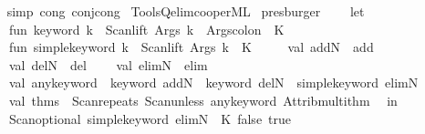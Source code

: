 \begin{isabellebody}
%
\isadelimproof
\ \ %
\endisadelimproof
%
\isatagproof
{}\isamarkupfalse%
\ {\isacharparenleft}{\kern0pt}simp\ cong{\isacharcolon}{\kern0pt}\ conj{\isacharunderscore}{\kern0pt}cong{\isacharparenright}{\kern0pt}%
\endisatagproof
{\isafoldproof}%
%
\isadelimproof
\isanewline
%
\endisadelimproof
%
\isadelimML
\isanewline
%
\endisadelimML
%
\isatagML
{}\isamarkupfalse%
\ {\isacartoucheopen}Tools{\isacharslash}{\kern0pt}Qelim{\isacharslash}{\kern0pt}cooper{\isachardot}{\kern0pt}ML{\isacartoucheclose}\isanewline
\isanewline
{}\isamarkupfalse%
\ presburger\ {\isacharequal}{\kern0pt}\ {\isacartoucheopen}\isanewline
\ \ let\isanewline
\ \ \ \ fun\ keyword\ k\ {\isacharequal}{\kern0pt}\ Scan{\isachardot}{\kern0pt}lift\ {\isacharparenleft}{\kern0pt}Args{\isachardot}{\kern0pt}{\isachardollar}{\kern0pt}{\isachardollar}{\kern0pt}{\isachardollar}{\kern0pt}\ k\ {\isacharminus}{\kern0pt}{\isacharminus}{\kern0pt}\ Args{\isachardot}{\kern0pt}colon{\isacharparenright}{\kern0pt}\ {\isachargreater}{\kern0pt}{\isachargreater}{\kern0pt}\ K\ {\isacharparenleft}{\kern0pt}{\isacharparenright}{\kern0pt}\isanewline
\ \ \ \ fun\ simple{\isacharunderscore}{\kern0pt}keyword\ k\ {\isacharequal}{\kern0pt}\ Scan{\isachardot}{\kern0pt}lift\ {\isacharparenleft}{\kern0pt}Args{\isachardot}{\kern0pt}{\isachardollar}{\kern0pt}{\isachardollar}{\kern0pt}{\isachardollar}{\kern0pt}\ k{\isacharparenright}{\kern0pt}\ {\isachargreater}{\kern0pt}{\isachargreater}{\kern0pt}\ K\ {\isacharparenleft}{\kern0pt}{\isacharparenright}{\kern0pt}\isanewline
\ \ \ \ val\ addN\ {\isacharequal}{\kern0pt}\ {\isachardoublequote}{\kern0pt}add{\isachardoublequote}{\kern0pt}\isanewline
\ \ \ \ val\ delN\ {\isacharequal}{\kern0pt}\ {\isachardoublequote}{\kern0pt}del{\isachardoublequote}{\kern0pt}\isanewline
\ \ \ \ val\ elimN\ {\isacharequal}{\kern0pt}\ {\isachardoublequote}{\kern0pt}elim{\isachardoublequote}{\kern0pt}\isanewline
\ \ \ \ val\ any{\isacharunderscore}{\kern0pt}keyword\ {\isacharequal}{\kern0pt}\ keyword\ addN\ {\isacharbar}{\kern0pt}{\isacharbar}{\kern0pt}\ keyword\ delN\ {\isacharbar}{\kern0pt}{\isacharbar}{\kern0pt}\ simple{\isacharunderscore}{\kern0pt}keyword\ elimN\isanewline
\ \ \ \ val\ thms\ {\isacharequal}{\kern0pt}\ Scan{\isachardot}{\kern0pt}repeats\ {\isacharparenleft}{\kern0pt}Scan{\isachardot}{\kern0pt}unless\ any{\isacharunderscore}{\kern0pt}keyword\ Attrib{\isachardot}{\kern0pt}multi{\isacharunderscore}{\kern0pt}thm{\isacharparenright}{\kern0pt}\isanewline
\ \ in\isanewline
\ \ \ \ Scan{\isachardot}{\kern0pt}optional\ {\isacharparenleft}{\kern0pt}simple{\isacharunderscore}{\kern0pt}keyword\ elimN\ {\isachargreater}{\kern0pt}{\isachargreater}{\kern0pt}\ K\ false{\isacharparenright}{\kern0pt}\ true\ {\isacharminus}{\kern0pt}{\isacharminus}{\kern0pt}\isanewline

\end{isabellebody}

